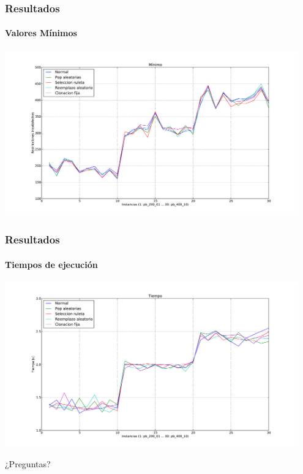 \frame
{
\frametitle{Resultados}
\framesubtitle{Valores Mínimos}
\begin{center}
\includegraphics[width=0.95\textwidth]{../doc/img/min.pdf}
\end{center}

}

\frame
{
\frametitle{Resultados}
\framesubtitle{Tiempos de ejecución}
\begin{center}
\includegraphics[width=0.95\textwidth]{../doc/img/t.pdf}
\end{center}

}

\frame
{
\vspace{1cm}
\begin{center}
\Huge{¿Preguntas?}
\end{center}
}
